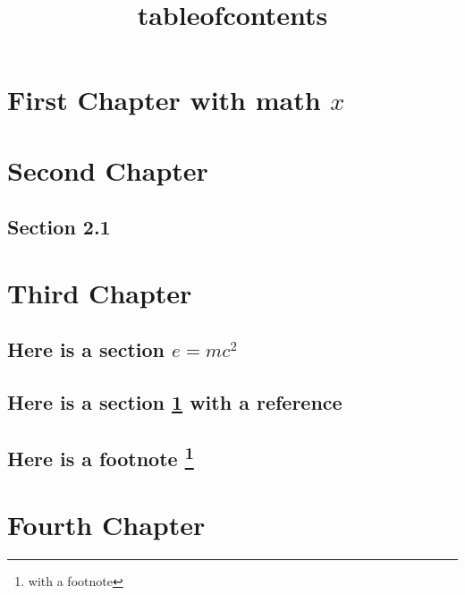 \documentclass{amsbook}
\title{tableofcontents}
\begin{document}
\frontmatter

\maketitle

\tableofcontents

\mainmatter

\chapter{First Chapter with math $x$}
\label{chap:1}

\chapter{Second Chapter}
\label{chap:2}

\section{Section 2.1}

\chapter{Third Chapter}

\section{Here is a section $e = mc^2$}

\section{Here is a section \ref{chap:1} with a reference}

\section{Here is a footnote \protect\footnote{with a footnote}}

\chapter{Fourth Chapter}
\end{document}
